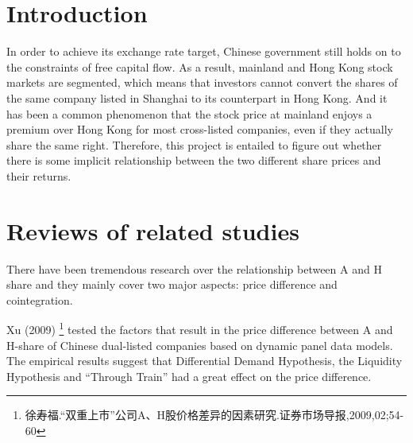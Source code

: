 \documentclass[aps,pre,12pt,preprint,onecolumn,showpacs,showkeys]{revtex4-1}
\begin{document}
\maketitle

\begin{spacing}{1.5}
    \tableofcontents
\end{spacing}
\newpage


\section{Introduction}
In order to achieve its exchange rate target, Chinese government still holds on to the constraints of free capital flow. As a result, mainland and Hong Kong stock markets are segmented, which means that investors cannot convert the shares of the same company listed in Shanghai to its counterpart in Hong Kong. And it has been a common phenomenon that the stock price at mainland enjoys a premium over Hong Kong for most cross-listed companies, even if they actually share the same right. Therefore, this project is entailed to figure out whether there is some implicit relationship between the two different share prices and their returns.

\section{Reviews of related studies}
There have been tremendous research over the relationship between A and H share and they mainly cover two major aspects: price difference and cointegration.

Xu (2009) 
\footnote{徐寿福.“双重上市”公司A、H股价格差异的因素研究.证券市场导报,2009,02;54-60}
tested the factors that result in the price difference between A and H-share of Chinese dual-listed companies based on dynamic panel data models. The empirical results suggest that Differential Demand Hypothesis, the Liquidity Hypothesis and “Through Train” had a great effect on the price difference.
\end{document}
